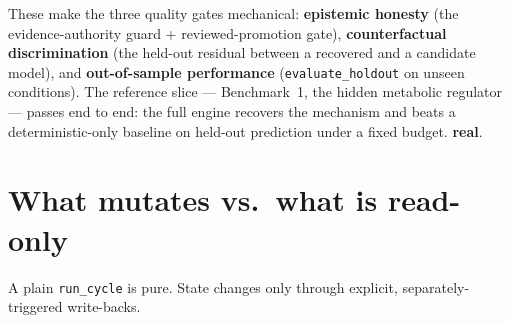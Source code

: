 \documentclass[11pt]{article}
\newcommand{\code}[1]{\texttt{\small #1}}
\newcommand{\real}{\textcolor{good}{\textbf{real}}}
\begin{document}
\noindent These make the three quality gates mechanical: \textbf{epistemic honesty} (the
evidence-authority guard + reviewed-promotion gate), \textbf{counterfactual discrimination} (the
held-out residual between a recovered and a candidate model), and \textbf{out-of-sample
performance} (\code{evaluate\_holdout} on unseen conditions). The reference slice --- Benchmark~1,
the hidden metabolic regulator --- passes end to end: the full engine recovers the mechanism and
beats a deterministic-only baseline on held-out prediction under a fixed budget. \real.

\section{What mutates vs.\ what is read-only}

A plain \code{run\_cycle} is pure. State changes only through explicit, separately-triggered
write-backs.
\end{document}
